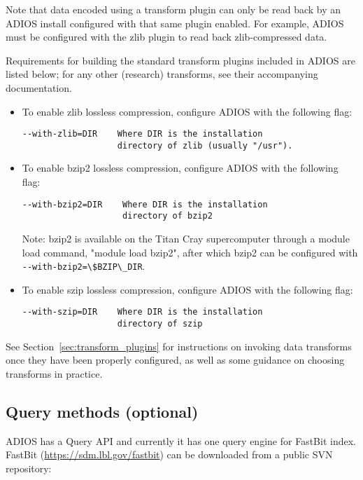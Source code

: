 Note that data encoded using a transform plugin can only be read
back by an ADIOS install configured with that same plugin enabled. For example,
ADIOS must be configured with the zlib plugin to read back zlib-compressed
data.

Requirements for building the standard transform plugins
included in ADIOS are listed below; for any other (research) transforms, see their accompanying
documentation.

\begin{itemize}
\item
To enable zlib lossless compression, configure ADIOS with the following flag:
\begin{lstlisting}
--with-zlib=DIR    Where DIR is the installation
                   directory of zlib (usually "/usr").
\end{lstlisting}

\item
To enable bzip2 lossless compression, configure ADIOS with the following flag:
\begin{lstlisting}
--with-bzip2=DIR    Where DIR is the installation
                    directory of bzip2
\end{lstlisting}
Note: bzip2 is available on the Titan Cray supercomputer through a module load command,
"module load bzip2", after which bzip2 can be configured with
\verb+--with-bzip2=\$BZIP\_DIR+.

\item
To enable szip lossless compression, configure ADIOS with the following flag:
\begin{lstlisting}
--with-szip=DIR    Where DIR is the installation
                   directory of szip
\end{lstlisting}
\end{itemize}

See Section~\ref{sec:transform_plugins} for instructions on invoking data transforms once they have been properly configured,
as well as some guidance on choosing transforms in practice.


\subsection{Query methods (optional)}
\label{sec:installation-query-api}

ADIOS has a Query API and currently it has one query engine for FastBit index. FastBit (\url{https://sdm.lbl.gov/fastbit}) can be downloaded from a public SVN repository:


